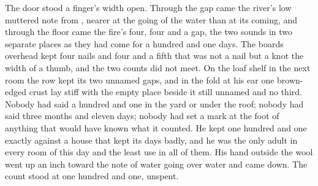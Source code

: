 The door stood a finger's width open. Through the gap came the river's low muttered note from , nearer at the going of the water than at its coming, and through the floor came the fire's four, four and a gap, the two sounds in two separate places as they had come for a hundred and one days. The boards overhead kept four nails and four and a fifth that was not a nail but a knot the width of a thumb, and the two counts did not meet. On the loaf shelf in the next room the row kept its two unnamed gaps, and in the fold at his ear one brown-edged crust lay stiff with the empty place beside it still unnamed and no third. Nobody had said a hundred and one in the yard or under the roof; nobody had said three months and eleven days; nobody had set a mark at the foot of anything that would have known what it counted. He kept one hundred and one exactly against a house that kept its days badly, and he was the only adult in every room of this day and the least use in all of them. His hand outside the wool went up an inch toward the note of water going over water and came down. The count stood at one hundred and one, unspent.
